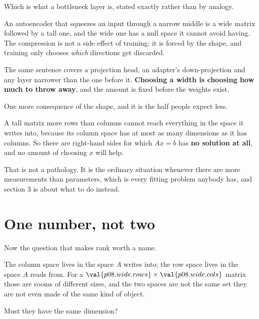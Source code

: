 \begin{fr}
\begin{aibox}
Which is what a bottleneck layer is, stated exactly rather than by analogy.

An autoencoder that squeezes an input through a narrow middle is a wide matrix
followed by a tall one, and the wide one has a null space it cannot avoid
having. The compression is not a side effect of training: it is forced by the
shape, and training only chooses \emph{which} directions get discarded.

The same sentence covers a projection head, an adapter's down-projection and
any layer narrower than the one before it. \textbf{Choosing a width is choosing
how much to throw away}, and the amount is fixed before the weights exist.
\end{aibox}
\end{fr}

\begin{fr}
One more consequence of the shape, and it is the half people expect less.

A tall matrix \dash{} more rows than columns \dash{} cannot reach everything in
the space it writes into, because its column space has at most as many
dimensions as it has columns. So there are right-hand sides for which $Ax = b$
has \textbf{no solution at all}, and no amount of choosing $x$ will help.

That is not a pathology. It is the ordinary situation whenever there are more
measurements than parameters, which is every fitting problem anybody has, and
section 3 is about what to do instead.
\end{fr}

\section{One number, not two}
\label{sec:P08-rank}

\begin{fr}
Now the question that makes rank worth a name.

The column space lives in the space $A$ writes into; the row space lives in the
space $A$ reads from. For a $\val{p08.wide.rows} \times \val{p08.wide.cols}$
matrix those are rooms of different sizes, and the two spaces are not the same
set \dash{} they are not even made of the same kind of object.

Must they have the same dimension?
\dotline
\nextframe
\end{fr}

